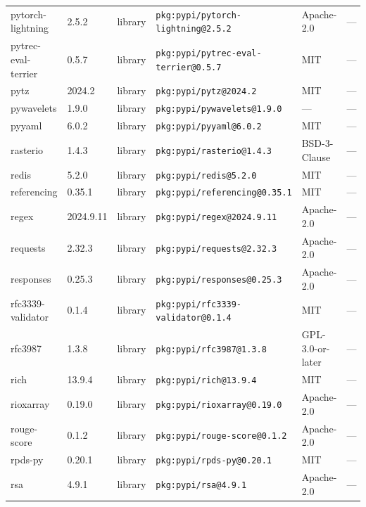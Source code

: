 \documentclass[11pt,a4paper]{article}
\begin{document}
\begin{longtable}{|p{4cm}|p{2cm}|p{1.6cm}|p{5cm}|p{1.5cm}|p{3.5cm}|}
\raggedright pytorch-lightning & 2.5.2 & library & \small\texttt{pkg:pypi/pytorch-lightning@2.5.2} & Apache-2.0 & \small — \\
\raggedright pytrec-eval-terrier & 0.5.7 & library & \small\texttt{pkg:pypi/pytrec-eval-terrier@0.5.7} & MIT & \small — \\
\raggedright pytz & 2024.2 & library & \small\texttt{pkg:pypi/pytz@2024.2} & MIT & \small — \\
\raggedright pywavelets & 1.9.0 & library & \small\texttt{pkg:pypi/pywavelets@1.9.0} & — & \small — \\
\raggedright pyyaml & 6.0.2 & library & \small\texttt{pkg:pypi/pyyaml@6.0.2} & MIT & \small — \\
\raggedright rasterio & 1.4.3 & library & \small\texttt{pkg:pypi/rasterio@1.4.3} & BSD-3-Clause & \small — \\
\raggedright redis & 5.2.0 & library & \small\texttt{pkg:pypi/redis@5.2.0} & MIT & \small — \\
\raggedright referencing & 0.35.1 & library & \small\texttt{pkg:pypi/referencing@0.35.1} & MIT & \small — \\
\raggedright regex & 2024.9.11 & library & \small\texttt{pkg:pypi/regex@2024.9.11} & Apache-2.0 & \small — \\
\raggedright requests & 2.32.3 & library & \small\texttt{pkg:pypi/requests@2.32.3} & Apache-2.0 & \small — \\
\raggedright responses & 0.25.3 & library & \small\texttt{pkg:pypi/responses@0.25.3} & Apache-2.0 & \small — \\
\raggedright rfc3339-validator & 0.1.4 & library & \small\texttt{pkg:pypi/rfc3339-validator@0.1.4} & MIT & \small — \\
\raggedright rfc3987 & 1.3.8 & library & \small\texttt{pkg:pypi/rfc3987@1.3.8} & GPL-3.0-or-later & \small — \\
\raggedright rich & 13.9.4 & library & \small\texttt{pkg:pypi/rich@13.9.4} & MIT & \small — \\
\raggedright rioxarray & 0.19.0 & library & \small\texttt{pkg:pypi/rioxarray@0.19.0} & Apache-2.0 & \small — \\
\raggedright rouge-score & 0.1.2 & library & \small\texttt{pkg:pypi/rouge-score@0.1.2} & Apache-2.0 & \small — \\
\raggedright rpds-py & 0.20.1 & library & \small\texttt{pkg:pypi/rpds-py@0.20.1} & MIT & \small — \\
\raggedright rsa & 4.9.1 & library & \small\texttt{pkg:pypi/rsa@4.9.1} & Apache-2.0 & \small — \\

\end{longtable}
\end{document}
